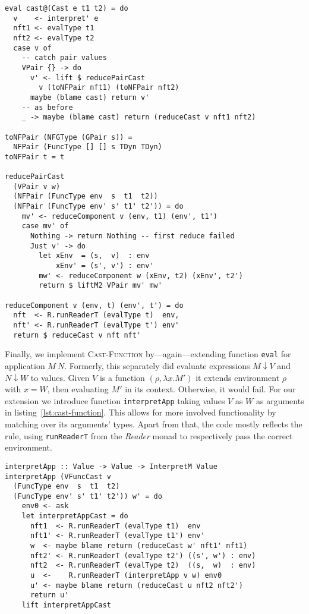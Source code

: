 \begin{lstlisting}[float,
  caption=Rule \textsc{Cast-Pair} (\texttt{Interpreter.hs}),
  label=lst:pair-cast]
eval cast@(Cast e t1 t2) = do
  v    <- interpret' e
  nft1 <- evalType t1
  nft2 <- evalType t2
  case v of
    -- catch pair values
    VPair {} -> do
      v' <- lift $ reducePairCast
        v (toNFPair nft1) (toNFPair nft2)
      maybe (blame cast) return v'
    -- as before
    _ -> maybe (blame cast) return (reduceCast v nft1 nft2)

toNFPair (NFGType (GPair s)) =
  NFPair (FuncType [] [] s TDyn TDyn)
toNFPair t = t

reducePairCast
  (VPair v w)
  (NFPair (FuncType env  s  t1  t2))
  (NFPair (FuncType env' s' t1' t2')) = do
    mv' <- reduceComponent v (env, t1) (env', t1')
    case mv' of
      Nothing -> return Nothing -- first reduce failed
      Just v' -> do
        let xEnv  = (s,  v)  : env
            xEnv' = (s', v') : env'
        mw' <- reduceComponent w (xEnv, t2) (xEnv', t2')
        return $ liftM2 VPair mv' mw'

reduceComponent v (env, t) (env', t') = do
  nft  <- R.runReaderT (evalType t)  env,
  nft' <- R.runReaderT (evalType t') env'
  return $ reduceCast v nft nft'
\end{lstlisting}

Finally, we implement \textsc{Cast-Function} by---again---extending function \texttt{eval} for application $M~N$. Formerly, this separately did evaluate expressions $M \downarrow V$ and $N \downarrow W$ to values. Given $V$ is a function $(\rho, \lambda x. M')$ it extends environment $\rho$ with $x=W$, then evaluating $M'$ in its context. Otherwise, it would fail. For our extension we introduce function \texttt{interpretApp} taking values $V$ as $W$ as arguments in listing~\ref{lst:cast-function}. This allows for more involved functionality by matching over its arguments' types. Apart from that, the code mostly reflects the rule, using \texttt{runReaderT} from the \emph{Reader} monad to respectively pass the correct environment.

\begin{lstlisting}[float,
  caption=Rule \textsc{Cast-Function} (\texttt{Interpreter.hs}),
  label=lst:cast-function]
interpretApp :: Value -> Value -> InterpretM Value
interpretApp (VFuncCast v
  (FuncType env  s  t1  t2)
  (FuncType env' s' t1' t2')) w' = do
    env0 <- ask
    let interpretAppCast = do
      nft1  <- R.runReaderT (evalType t1)  env
      nft1' <- R.runReaderT (evalType t1') env'
      w  <- maybe blame return (reduceCast w' nft1' nft1)
      nft2' <- R.runReaderT (evalType t2') ((s', w') : env)
      nft2  <- R.runReaderT (evalType t2)  ((s,  w)  : env)
      u  <-    R.runReaderT (interpretApp v w) env0
      u' <- maybe blame return (reduceCast u nft2 nft2')
      return u'
    lift interpretAppCast
\end{lstlisting}

